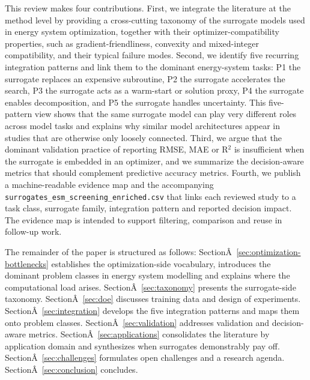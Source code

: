 This review makes four contributions. First, we integrate the literature
at the method level by providing a cross-cutting taxonomy of the
surrogate models used in energy system optimization, together with their
optimizer-compatibility properties, such as gradient-friendliness,
convexity and mixed-integer compatibility, and their typical failure
modes. Second, we identify five recurring integration patterns and link
them to the dominant energy-system tasks: P1 the surrogate replaces an
expensive subroutine, P2 the surrogate accelerates the search, P3 the
surrogate acts as a warm-start or solution proxy, P4 the surrogate
enables decomposition, and P5 the surrogate handles uncertainty. This
five-pattern view shows that the same surrogate model can play very
different roles across model tasks and explains why similar model
architectures appear in studies that are otherwise only loosely
connected. Third, we argue that the dominant validation practice of
reporting RMSE, MAE or R$^2$ is insufficient when the surrogate is
embedded in an optimizer, and we summarize the decision-aware metrics
that should complement predictive accuracy metrics. Fourth, we publish a
machine-readable evidence map and the accompanying
\texttt{surrogates_esm_screening_enriched.csv} that links each reviewed study
to a task class, surrogate family, integration pattern and reported
decision impact. The evidence map is intended to support filtering,
comparison and reuse in follow-up work.

The remainder of the paper is structured as follows:
SectionÂ~\ref{sec:optimization-bottlenecks} establishes the optimization-side
vocabulary, introduces the dominant problem classes in energy system
modelling and explains where the computational load arises.
SectionÂ~\ref{sec:taxonomy} presents the surrogate-side taxonomy.
SectionÂ~\ref{sec:doe}
discusses training data and design of experiments.
SectionÂ~\ref{sec:integration} develops the five integration patterns and
maps them onto problem classes.
SectionÂ~\ref{sec:validation} addresses validation and decision-aware
metrics. SectionÂ~\ref{sec:applications} consolidates the literature by application
domain and synthesizes when surrogates demonstrably pay off.
SectionÂ~\ref{sec:challenges} formulates open challenges and a research
agenda. SectionÂ~\ref{sec:conclusion} concludes.
